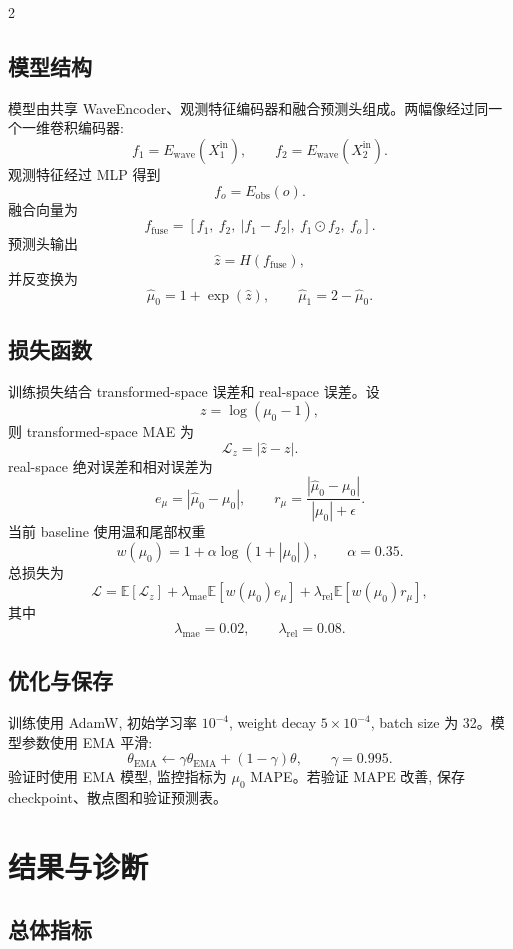 \documentclass[11pt,a4paper]{ctexart}
\begin{document}
\begin{multicols}{2}
\subsection{模型结构}
\justifying

模型由共享 WaveEncoder、观测特征编码器和融合预测头组成。两幅像经过同一个一维卷积编码器:
\[
    f_1 = E_{\mathrm{wave}}(X_1^{\mathrm{in}}),\qquad
    f_2 = E_{\mathrm{wave}}(X_2^{\mathrm{in}}).
\]
观测特征经过 MLP 得到
\[
    f_o = E_{\mathrm{obs}}(o).
\]
融合向量为
\[
    f_{\mathrm{fuse}}
    =
    \left[
    f_1,\ f_2,\ |f_1-f_2|,\ f_1\odot f_2,\ f_o
    \right].
\]
预测头输出
\[
    \hat{z}=H(f_{\mathrm{fuse}}),
\]
并反变换为
\[
    \hat{\mu}_0=1+\exp(\hat{z}),\qquad
    \hat{\mu}_1=2-\hat{\mu}_0.
\]

\subsection{损失函数}
\justifying

训练损失结合 transformed-space 误差和 real-space 误差。设
\[
    z=\log(\mu_0-1),
\]
则 transformed-space MAE 为
\[
    \mathcal{L}_{z} = |\hat{z}-z|.
\]
real-space 绝对误差和相对误差为
\[
    e_{\mu}=|\hat{\mu}_0-\mu_0|,\qquad
    r_{\mu}=\frac{|\hat{\mu}_0-\mu_0|}{|\mu_0|+\epsilon}.
\]
当前 baseline 使用温和尾部权重
\[
    w(\mu_0)=1+\alpha\log(1+|\mu_0|),\qquad \alpha=0.35.
\]
总损失为
\[
    \mathcal{L}
    =
    \mathbb{E}[\mathcal{L}_{z}]
    + \lambda_{\mathrm{mae}}\mathbb{E}[w(\mu_0)e_{\mu}]
    + \lambda_{\mathrm{rel}}\mathbb{E}[w(\mu_0)r_{\mu}],
\]
其中
\[
    \lambda_{\mathrm{mae}}=0.02,\qquad
    \lambda_{\mathrm{rel}}=0.08.
\]

\subsection{优化与保存}
\justifying

训练使用 AdamW, 初始学习率 \(10^{-4}\), weight decay \(5\times 10^{-4}\), batch size 为 32。模型参数使用 EMA 平滑:
\[
    \theta_{\mathrm{EMA}}
    \leftarrow
    \gamma\theta_{\mathrm{EMA}}+(1-\gamma)\theta,
    \qquad \gamma=0.995.
\]
验证时使用 EMA 模型, 监控指标为 \(\mu_0\) MAPE。若验证 MAPE 改善, 保存 checkpoint、散点图和验证预测表。

\section{结果与诊断}
\justifying

\subsection{总体指标}
\justifying


\end{multicols}
\end{document}
